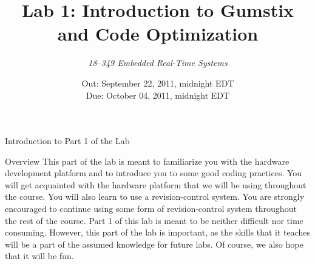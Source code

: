 \documentclass{article}
\title{\huge Lab 1: Introduction to Gumstix and Code Optimization}
\author{\Large\itshape 18--349 Embedded Real-Time Systems}
\date{
	Out: September 22, 2011, midnight EDT\\
	Due: October 04, 2011, midnight EDT \\
}
\begin{document}
	\maketitle

	\setcounter{tocdepth}{2}
	\tableofcontents
	\clearpage

	\begin{section}{Introduction to Part 1 of the Lab}
	\begin{subsection}{Overview} This part of the lab is meant to
	familiarize you with the hardware development platform and to
	introduce you to some good coding practices.  You will get acquainted with the hardware
	platform that we will be using throughout the course.  You
	will also learn to use a revision-control system.  You are
	strongly encouraged to continue using some form of revision-control
	system throughout the rest of the course.  Part 1 of this lab
	is meant to be neither difficult nor time consuming.  However, 
	this part of the lab is important, as the skills that it teaches
	will be a part of the assumed knowledge for future labs.  Of course, we also
	hope that it will be fun.  \end{subsection}


\end{section}
\end{document}

